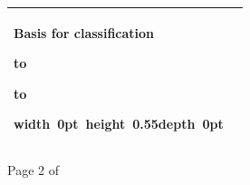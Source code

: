 \documentclass[12pt]{article}
\newcommand{\writingline}{%
  \par\vspace{0.45cm}\nointerlineskip%
  \hbox to \linewidth{\leaders\hrule height 0.4pt\hfill}%
  \vspace{0.10cm}}
\newcommand{\cellendspace}{%
  \par\nointerlineskip%
  \hbox{\vrule width 0pt height 0.55\baselineskip depth 0pt}\par}
\begin{document}
{\begin{tabularx}{\textwidth}{|>{\raggedright\arraybackslash}p{}|>{\raggedright\arraybackslash}X|}
  \vspace{0.35em}
  \textbf{Basis for classification}
  \writingline
  \writingline
  \cellendspace
  \tabularnewline
  \hline
\end{tabularx}\par
}

\vfill
\begin{center}
  \small Page 2 of \underline{\hspace{1.3cm}}
\end{center}
\end{document}
